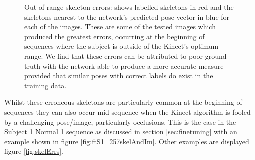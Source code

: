 \documentclass[11pt]{article} %
\begin{document}
\begin{figure}
\qquad%
%
\caption{Out of range skeleton errors: shows labelled skeletons in red and the skeletons nearest to the network's predicted pose vector in blue for each of the images. These are some of the tested images which produced the greatest errors, occurring at the beginning of sequences where the subject is outside of the Kinect’s optimum range. We find that these errors can be attributed to poor ground truth with the network able to produce a more accurate measure provided that similar poses with correct labels do exist in the training data. }
\label{fig:badSkels}
\end{figure}

Whilst these erroneous skeletons are particularly common at the beginning of sequences they can also occur mid sequence when the Kinect algorithm is fooled by a challenging pose/image, particularly occlusions. This is the case in the Subject 1 Normal 1 sequence as discussed in section \ref{sec:finetuning} with an example shown in figure \ref{fig:ftS1_257skelAndIm}. Other examples are displayed figure \ref{fig:skelErrs}.
\end{document}
